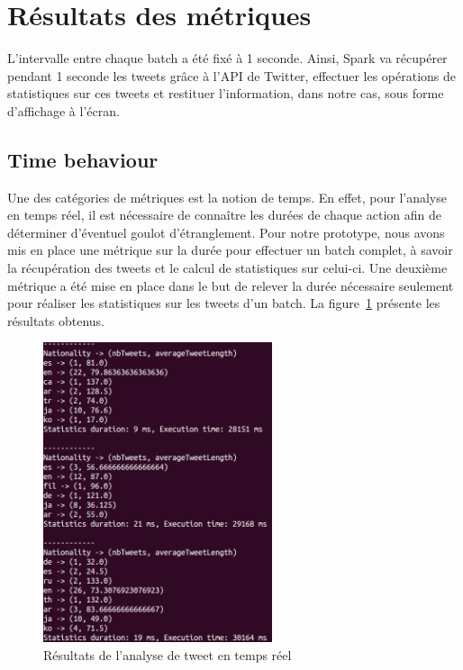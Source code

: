 \section{Résultats des métriques}
  L'intervalle entre chaque batch a été fixé à 1 seconde. Ainsi, Spark va récupérer pendant 1 seconde les tweets grâce à l'API de Twitter, effectuer les opérations de statistiques sur ces tweets et restituer l'information, dans notre cas, sous forme d'affichage à l'écran.

  \subsection{Time behaviour}
    Une des catégories de métriques est la notion de temps. En effet, pour l'analyse en temps réel, il est nécessaire de connaître les durées de chaque action afin de déterminer d'éventuel goulot d'étranglement. Pour notre prototype, nous avons mis en place une métrique sur la durée pour effectuer un batch complet, à savoir la récupération des tweets et le calcul de statistiques sur celui-ci. Une deuxième métrique a été mise en place dans le but de relever la durée nécessaire seulement pour réaliser les statistiques sur les tweets d'un batch. La figure~\ref{fig:resultats_stat_tweet} présente les résultats obtenus. \\

    \begin{figure}
      \centering
      \includegraphics[width=0.6\textwidth]{images/stat_results.png}
      \caption{Résultats de l'analyse de tweet en temps réel}
      \label{fig:resultats_stat_tweet}
    \end{figure}


